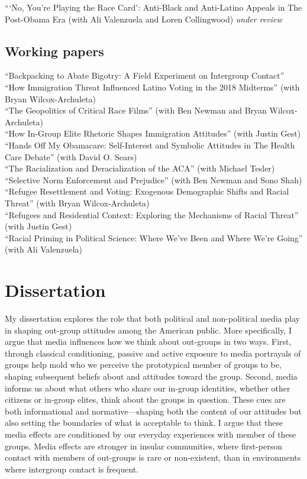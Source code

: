 \documentclass[11pt, a4paper]{article}
\newcommand{\years}[1]{\marginnote{\scriptsize #1}}
\begin{document}
\years{}```No, You’re Playing the Race Card': Anti-Black and Anti-Latino Appeals in The Post-Obama Era (with Ali Valenzuela and Loren Collingwood) \textit{under review}\\

\subsection*{Working papers}

\years{}``Backpacking to Abate Bigotry: A Field Experiment on Intergroup Contact''\\
\years{}``How Immigration Threat Influenced Latino Voting in the 2018 Midterms'' (with Bryan Wilcox-Archuleta)\\
\years{}``The Geopolitics of Critical Race Films'' (with Ben Newman and Bryan Wilcox-Archuleta)\\
\years{}``How In-Group Elite Rhetoric Shapes Immigration Attitudes'' (with Justin Gest)\\
\years{}``Hands Off My Obamacare: Self-Interest and Symbolic Attitudes in The Health Care Debate'' (with David O. Sears)\\
\years{}``The Racialization and Deracialization of the ACA'' (with Michael Tesler)\\
\years{}``Selective Norm Enforcement and Prejudice'' (with Ben Newman and Sono Shah)\\
\years{}``Refugee Resettlement and Voting: Exogenous Demographic Shifts and Racial Threat'' (with Bryan Wilcox-Archuleta)\\
\years{}``Refugees and Residential Context: Exploring the Mechanisms of Racial Threat'' (with Justin Gest)\\
\years{}``Racial Priming in Political Science: Where We've Been and Where We're Going'' (with Ali Valenzuela)\\

\section*{Dissertation}

My dissertation explores the role that both political and non-political media play in shaping out-group attitudes among the American public. More specifically, I argue that media influences how we think about out-groups in two ways. First, through classical conditioning, passive and active exposure to media portrayals of groups help mold who we perceive the prototypical member of groups to be, shaping subsequent beliefs about and attitudes toward the group. Second, media informs us about what others who share our in-group identities, whether other citizens or in-group elites, think about the groups in question. These cues are both informational and normative---shaping both the content of our attitudes but also setting the boundaries of what is acceptable to think. I argue that these media effects are conditioned by our everyday experiences with member of these groups. Media effects are stronger in insular communities, where first-person contact with members of out-groups is rare or non-existent, than in environments where intergroup contact is frequent.
\end{document}
